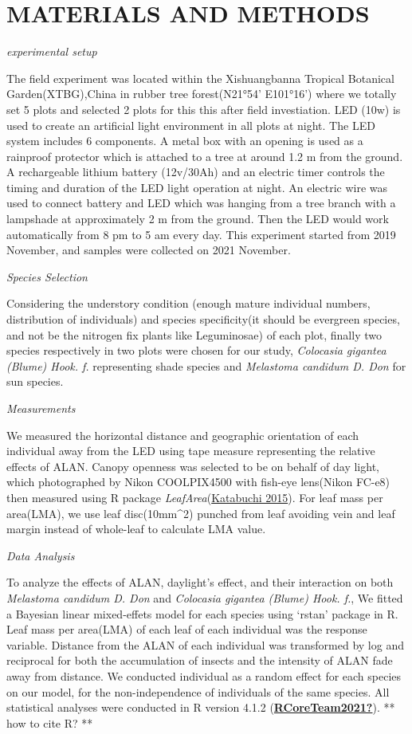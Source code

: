 \documentclass[
]{article}
\begin{document}
\hypertarget{materials-and-methods}{%
\section{MATERIALS AND METHODS}\label{materials-and-methods}}

\emph{experimental setup}

The field experiment was located within the Xishuangbanna Tropical
Botanical Garden(XTBG),China in rubber tree forest(N21°54' E101°16')
where we totally set 5 plots and selected 2 plots for this this after
field investiation. LED (10w) is used to create an artificial light
environment in all plots at night. The LED system includes 6 components.
A metal box with an opening is used as a rainproof protector which is
attached to a tree at around 1.2 m from the ground. A rechargeable
lithium battery (12v/30Ah) and an electric timer controls the timing and
duration of the LED light operation at night. An electric wire was used
to connect battery and LED which was hanging from a tree branch with a
lampshade at approximately 2 m from the ground. Then the LED would work
automatically from 8 pm to 5 am every day. This experiment started from
2019 November, and samples were collected on 2021 November.

\emph{Species Selection}

Considering the understory condition (enough mature individual numbers,
distribution of individuals) and species specificity(it should be
evergreen species, and not be the nitrogen fix plants like Leguminosae)
of each plot, finally two species respectively in two plots were chosen
for our study, \emph{Colocasia gigantea (Blume) Hook. f.} representing
shade species and \emph{Melastoma candidum D. Don} for sun species.

\emph{Measurements}

We measured the horizontal distance and geographic orientation of each
individual away from the LED using tape measure representing the
relative effects of ALAN. Canopy openness was selected to be on behalf
of day light, which photographed by Nikon COOLPIX4500 with fish-eye
lens(Nikon FC-e8) then measured using R package
\emph{LeafArea}(\protect\hyperlink{ref-Katabuchi2015}{Katabuchi 2015}).
For leaf mass per area(LMA), we use leaf disc(10mm\^{}2) punched from
leaf avoiding vein and leaf margin instead of whole-leaf to calculate
LMA value.

\emph{Data Analysis}

To analyze the effects of ALAN, daylight's effect, and their interaction
on both \emph{Melastoma candidum D. Don} and \emph{Colocasia gigantea
(Blume) Hook. f.}, We fitted a Bayesian linear mixed-effets model for
each species using `rstan' package in R. Leaf mass per area(LMA) of each
leaf of each individual was the response variable. Distance from the
ALAN of each individual was transformed by log and reciprocal for both
the accumulation of insects and the intensity of ALAN fade away from
distance. We conducted individual as a random effect for each species on
our model, for the non-independence of individuals of the same species.
All statistical analyses were conducted in R version 4.1.2
(\protect\hyperlink{ref-RCoreTeam2021}{\textbf{RCoreTeam2021?}}). ** how
to cite R? **
\end{document}
